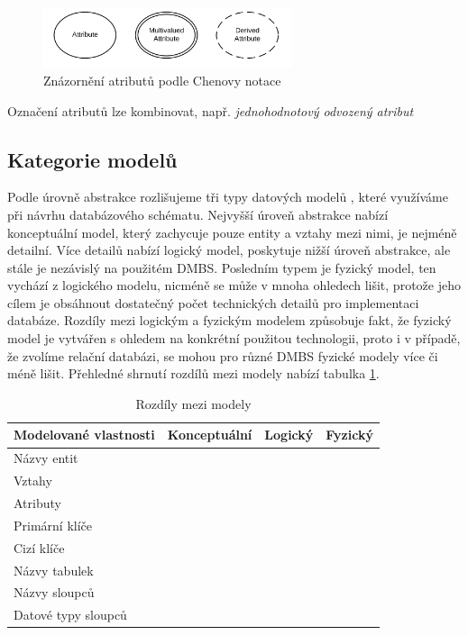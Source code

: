 \documentclass[czech,bachelor,public,dept460,male,oneside]{diploma}
\newcommand{\xmark}{\ding{55}}
\newcommand{\cmark}{\ding{51}}
\begin{document}
	\begin{figure}[!h]
		\centering
		\includegraphics[width=0.65\textwidth]{Figures/ChenAttr}
		\caption[Znázornění atributů podle Chenovy notace]{Znázornění atributů podle Chenovy notace \cite{erdSymbols}}
	\end{figure}
	
	Označení atributů lze kombinovat, např. \textit{jednohodnotový odvozený atribut}
	
	\subsection{Kategorie modelů}
	Podle úrovně abstrakce rozlišujeme tři typy datových modelů \cite{whatIsERD}, které využíváme při návrhu databázového schématu. Nejvyšší úroveň abstrakce nabízí konceptuální model, který zachycuje pouze entity a vztahy mezi nimi, je nejméně detailní. Více detailů nabízí logický model, poskytuje nižší úroveň abstrakce, ale stále je nezávislý na použitém DMBS. Posledním typem je fyzický model, ten vychází z logického modelu, nicméně se může v mnoha ohledech lišit, protože jeho cílem je obsáhnout dostatečný počet technických detailů pro implementaci databáze. Rozdíly mezi logickým a fyzickým modelem způsobuje fakt, že fyzický model je vytvářen s ohledem na konkrétní použitou technologii, proto i v případě, že zvolíme relační databázi, se mohou pro různé DMBS fyzické modely více či méně lišit. Přehledné shrnutí rozdílů mezi modely nabízí tabulka \ref{tab:modelTypes}.
	
	\begin{table}[!h]
		\centering
		\caption{Rozdíly mezi modely}
		\label{tab:modelTypes}
		\begin{tabular}{l c c c}
			\toprule
			Modelované vlastnosti & Konceptuální & Logický & Fyzický \\
			\midrule
			Názvy entit & \cmark & \cmark & \xmark \\
			Vztahy & \cmark& \cmark & \xmark \\
			Atributy & \cmark& \cmark & \xmark \\
			Primární klíče & \xmark & \cmark & \cmark \\
			Cizí klíče & \xmark & \cmark & \cmark \\
			Názvy tabulek & \xmark & \xmark & \cmark \\
			Názvy sloupců & \xmark & \xmark & \cmark \\
			Datové typy sloupců & \xmark & \xmark & \cmark \\
			\midrule
		\end{tabular}
	\end{table}
	
\end{document}
